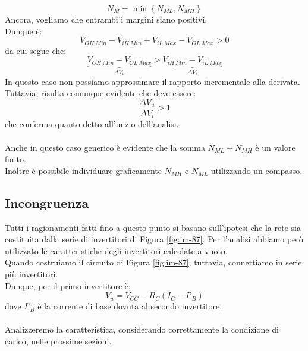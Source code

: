 \documentclass[../main.tex]{subfiles}
\begin{document}
	$$N_M = \min \left\{N_{ML}, N_{MH}\right\}$$
	Ancora, vogliamo che entrambi i margini siano positivi. \\
	Dunque è:
	$$V_{OH\ Min} - V_{iH\ Min} + V_{iL\ Max} - V_{OL\ Max} > 0$$
	da cui segue che:
	$$\underbrace{V_{OH\ Min} - V_{OL\ Max}}_{\Delta V_u} > \underbrace{V_{iH\ Min} - V_{iL\ Max}}_{\Delta V_i}$$
	In questo caso non possiamo approssimare il rapporto incrementale alla derivata. \\
	Tuttavia, risulta comunque evidente che deve essere:
	$$\frac{\Delta V_u}{\Delta V_i} > 1$$
	che conferma quanto detto all’inizio dell’analisi.\\\\
	Anche in questo caso generico è evidente che la somma $N_{ML} + N_{MH}$ è un valore finito. \\
	Inoltre è possibile individuare graficamente $N_{MH}$ e $N_{ML}$ utilizzando un compasso.
	\subsection{Incongruenza}
	Tutti i ragionamenti fatti fino a questo punto si basano sull’ipotesi che la rete sia costituita dalla serie di invertitori di Figura \ref{fig:im-87}.
	Per l’analisi abbiamo però utilizzato le caratteristiche degli invertitori calcolate a vuoto. \\
	Quando costruiamo il circuito di Figura \ref{fig:im-87}, tuttavia, connettiamo in serie più invertitori. \\
	Dunque, per il primo invertitore è:
	$$V_u = V_{CC} - R_C \left(I_C - I’_B\right)$$
	dove $I’_B$ è la corrente di base dovuta al secondo invertitore.\\\\
	Analizzeremo la caratteristica, considerando correttamente la condizione di carico, nelle prossime sezioni.
\end{document}
